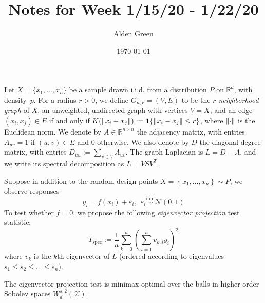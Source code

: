\documentclass{article}
\newcommand{\Reals}{\mathbb{R}}
\newcommand{\set}[1]{\left\{#1\right\}}
\newcommand{\1}{\mathbf{1}}
\newcommand{\Rd}{\Reals^d}
\newcommand{\Xset}{\mathcal{X}}
\theoremstyle{alden}
\theoremstyle{aldenthm}
\theoremstyle{definition}
\theoremstyle{remark}
\begin{document}
\title{Notes for Week 1/15/20 - 1/22/20}
\author{Alden Green}
\date{\today}
\maketitle

Let $X = \{x_1,
\ldots, x_n\}$ be a sample drawn i.i.d. from a distribution $P$ on $\Rd$,
with density~$p$.  For a radius $r > 0$, we define $G_{n,r}=(V,E)$ to be the
\emph{$r$-neighborhood graph} of $X$, an unweighted, undirected graph with
vertices $V=X$, and an edge $(x_i,x_j) \in E$ if and only if $K(\norm{x_i - x_j}) := \1\{\norm{x_i -x_j} \leq r\}$, where $\norm{\cdot}$ is the Euclidean norm. We denote by $A \in
\Reals^{n \times n}$ the adjacency matrix, with entries $A_{uv} = 1$ if
$(u,v) \in E$ and $0$ otherwise.  We also denote by $D$ the diagonal degree
matrix, with entries $D_{uu} := \sum_{v \in V} A_{uv}$. The graph Laplacian is $L = D - A$, and we write its spectral decomposition as $L = V S V^T$. 

Suppose in addition to the random design points $X = \set{x_1,\ldots,x_n} \sim P$, we observe responses
\begin{equation}
\label{eqn:regression_known_variance}
y_i = f(x_i) + \varepsilon_i, ~~ \varepsilon_i \overset{\textrm{i.i.d}}{\sim} \mathcal{N}(0,1)
\end{equation} 
To test whether $f = 0$, we propose the following \emph{eigenvector projection} test statistic:
\begin{equation}
\label{eqn:graph_spectral_projections}
T_{\mathrm{spec}} := \frac{1}{n} \sum_{k = 0}^{\kappa} \left(\sum_{i = 1}^{n} v_{k,i} y_i\right)^2
\end{equation}
where $v_k$ is the $k$th eigenvector of $L$ (ordered according to eigenvalues $s_1 \leq s_2 \leq \ldots \leq s_n$).

The eigenvector projection test is minimax optimal over the balls in higher order Sobolev spaces $W_d^{s,2}(\Xset)$.
\end{document}
